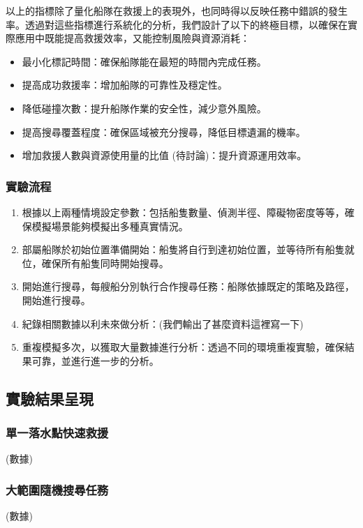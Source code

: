 \documentclass[12pt,a4paper]{article}
\begin{document}
以上的指標除了量化船隊在救援上的表現外，也同時得以反映任務中錯誤的發生率。透過對這些指標進行系統化的分析，我們設計了以下的終極目標，以確保在實際應用中既能提高救援效率，又能控制風險與資源消耗：
\begin{itemize}
    \item 最小化標記時間：確保船隊能在最短的時間內完成任務。
    \item 提高成功救援率：增加船隊的可靠性及穩定性。
    \item 降低碰撞次數：提升船隊作業的安全性，減少意外風險。
    \item 提高搜尋覆蓋程度：確保區域被充分搜尋，降低目標遺漏的機率。
    \item 增加救援人數與資源使用量的比值 (待討論)：提升資源運用效率。
\end{itemize}

\subsubsection{實驗流程}
\begin{enumerate}
    \item 根據以上兩種情境設定參數：包括船隻數量、偵測半徑、障礙物密度等等，確保模擬場景能夠模擬出多種真實情況。
    \item 部屬船隊於初始位置準備開始：船隻將自行到達初始位置，並等待所有船隻就位，確保所有船隻同時開始搜尋。
    \item 開始進行搜尋，每艘船分別執行合作搜尋任務：船隊依據既定的策略及路徑，開始進行搜尋。
    \item 紀錄相關數據以利未來做分析：(我們輸出了甚麼資料這裡寫一下)
    \item 重複模擬多次，以獲取大量數據進行分析：透過不同的環境重複實驗，確保結果可靠，並進行進一步的分析。
\end{enumerate}

\subsection{實驗結果呈現}
\subsubsection{單一落水點快速救援}
(數據)

\subsubsection{大範圍隨機搜尋任務}
(數據)
\end{document}
